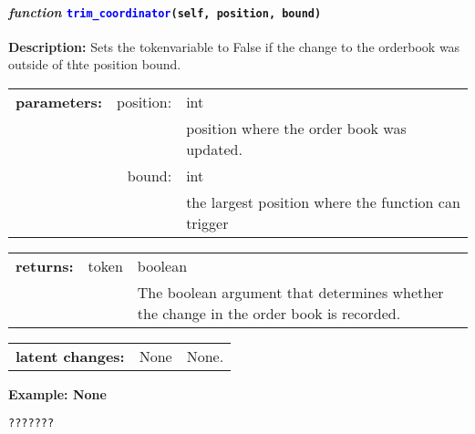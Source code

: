 \paragraph{\textit{function} \textcolor{blue}{\texttt{trim\_coordinator}}\texttt{(self, position, bound)}}\hfill\break
\noindent \textbf{Description:} Sets the tokenvariable to False if the change to the orderbook was outside of thte position  bound. 

\begin{tabular}{r r l }
	\textbf{parameters:}	& position: & int\\
	&  & position where the order book was updated.\\
	& bound:& int \\
	&& the largest position where the function can trigger\\
\end{tabular}

\begin{tabular}{l c l}
	\textbf{returns:} & token & boolean \\
	& & The boolean argument that determines whether the change in the order book is recorded.
\end{tabular}

\begin{tabular}{l c l}
	\textbf{latent changes:} & None & None.
\end{tabular}

\textbf{Example: None}
\begin{lstlisting}[language=Python]
???????
\end{lstlisting}